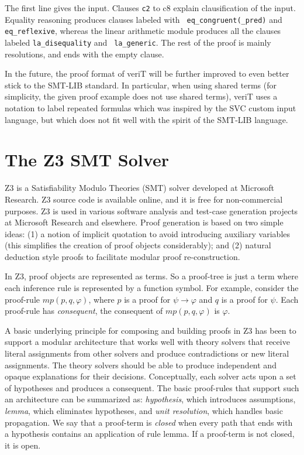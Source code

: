 \documentclass{llncs}
\begin{document}
The first line gives the input.  Clauses {\tt c2} to {c8} explain clausification
of the input.  Equality reasoning produces clauses labeled with {\tt
  eq\_congruent(\_pred)} and {\tt eq\_reflexive}, whereas the linear arithmetic
module produces all the clauses labeled {\tt la\_disequality} and {\tt
  la\_generic}.  The rest of the proof is mainly resolutions, and ends with the
empty clause.


In the future, the proof format of veriT will be further improved to even better
stick to the SMT-LIB standard.  In particular, when using shared terms (for
simplicity, the given proof example does not use shared terms), veriT uses a
notation to label repeated formulas which was inspired by the SVC custom input
language, but which does not fit well with the spirit of the SMT-LIB language.

\section{The Z3 SMT Solver}
\label{sec:z3}

Z3 is a Satisfiability Modulo Theories (SMT) solver developed at
Microsoft Research.  Z3 source code is available online, and it is
free for non-commercial purposes.  Z3 is used in various software
analysis and test-case generation projects at Microsoft Research and
elsewhere.  Proof generation is based on two simple ideas: (1) a
notion of implicit quotation to avoid introducing auxiliary variables
(this simplifies the creation of proof objects considerably); and (2) natural
deduction style proofs to facilitate modular proof re-construction.


In Z3, proof objects are represented as terms. So a proof-tree is just a term
where each inference rule is represented by a function symbol.
For example, consider the proof-rule $mp(p, q, \varphi)$, where $p$ is a proof for
$\psi \rightarrow \varphi$ and $q$ is a proof for $\psi$. Each proof-rule has
\emph{consequent}, the consequent of $mp(p, q, \varphi)$ is $\varphi$.

A basic underlying principle for composing and building proofs in Z3 has been to support a modular
architecture that works well with theory solvers that receive literal assignments from other solvers and
produce contradictions or new literal assignments. The theory solvers should be able to produce independent
and opaque explanations for their decisions.
Conceptually, each solver acts upon a set of hypotheses and produces a consequent. The basic proof-rules
that support such an architecture can be summarized as: \emph{hypothesis},
which introduces assumptions, \emph{lemma}, which eliminates hypotheses, and \emph{unit resolution}, which handles basic propagation.
We say that a proof-term is \emph{closed} when every path that ends with a hypothesis contains an application
of rule lemma. If a proof-term is not closed, it is open.
\end{document}
